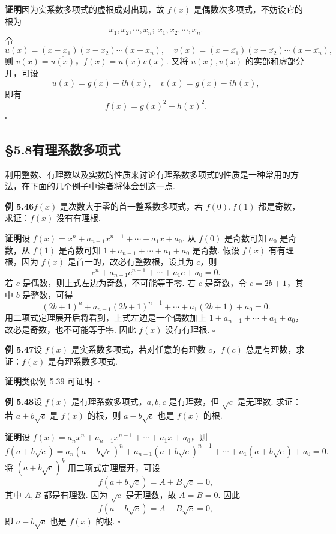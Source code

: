 \documentclass[UTF8, 12pt, fontset=fandol, oneside]{ctexart}
\begin{document}
\noindent\textbf{证明}\quad 因为实系数多项式的虚根成对出现，故 $f(x)$ 是偶数次多项式，不妨设它的根为
\[
x_1,x_2,\cdots,x_n;\ \overline{x_1},\overline{x_2},\cdots,\overline{x_n}.
\]
令
\[
u(x)=(x-x_1)(x-x_2)\cdots(x-x_n),\quad
v(x)=(x-\overline{x_1})(x-\overline{x_2})\cdots(x-\overline{x_n}),
\]
则 $v(x)=\overline{u(x)}$，$f(x)=u(x)v(x)$. 又将 $u(x),v(x)$ 的实部和虚部分开，可设
\[
u(x)=g(x)+ih(x),\quad v(x)=g(x)-ih(x),
\]
即有
\[
f(x)=g(x)^2+h(x)^2.
\]
\hfill $\square$

\subsection*{§5.8\quad 有理系数多项式}

利用整数、有理数以及实数的性质来讨论有理系数多项式的性质是一种常用的方法，在下面的几个例子中读者将体会到这一点.

\noindent\textbf{例 5.46}\quad $f(x)$ 是次数大于零的首一整系数多项式，若 $f(0),f(1)$ 都是奇数，求证：$f(x)$ 没有有理根.

\noindent\textbf{证明}\quad 设 $f(x)=x^n+a_{n-1}x^{n-1}+\cdots+a_1x+a_0$. 从 $f(0)$ 是奇数可知 $a_0$ 是奇数，从 $f(1)$ 是奇数可知 $1+a_{n-1}+\cdots+a_1+a_0$ 是奇数. 假设 $f(x)$ 有有理根，因为 $f(x)$ 是首一的，故必有整数根，设其为 $c$，则
\[
c^n+a_{n-1}c^{n-1}+\cdots+a_1c+a_0=0.
\]
若 $c$ 是偶数，则上式左边为奇数，不可能等于零. 若 $c$ 是奇数，令 $c=2b+1$，其中 $b$ 是整数，可得
\[
(2b+1)^n+a_{n-1}(2b+1)^{n-1}+\cdots+a_1(2b+1)+a_0=0.
\]
用二项式定理展开后将看到，上式左边是一个偶数加上 $1+a_{n-1}+\cdots+a_1+a_0$，故必是奇数，也不可能等于零. 因此 $f(x)$ 没有有理根. \hfill $\square$

\noindent\textbf{例 5.47}\quad 设 $f(x)$ 是实系数多项式，若对任意的有理数 $c$，$f(c)$ 总是有理数，求证：$f(x)$ 是有理系数多项式.

\noindent\textbf{证明}\quad 类似例 5.39 可证明. \hfill $\square$

\noindent\textbf{例 5.48}\quad 设 $f(x)$ 是有理系数多项式，$a,b,c$ 是有理数，但 $\sqrt c$ 是无理数. 求证：若 $a+b\sqrt c$ 是 $f(x)$ 的根，则 $a-b\sqrt c$ 也是 $f(x)$ 的根.

\noindent\textbf{证明}\quad 设 $f(x)=a_nx^n+a_{n-1}x^{n-1}+\cdots+a_1x+a_0$，则
\[
f(a+b\sqrt c)=a_n(a+b\sqrt c)^n+a_{n-1}(a+b\sqrt c)^{n-1}+\cdots+a_1(a+b\sqrt c)+a_0=0.
\]
将 $(a+b\sqrt c)^k$ 用二项式定理展开，可设
\[
f(a+b\sqrt c)=A+B\sqrt c=0,
\]
其中 $A,B$ 都是有理数. 因为 $\sqrt c$ 是无理数，故 $A=B=0$. 因此
\[
f(a-b\sqrt c)=A-B\sqrt c=0,
\]
即 $a-b\sqrt c$ 也是 $f(x)$ 的根. \hfill $\square$
\end{document}
